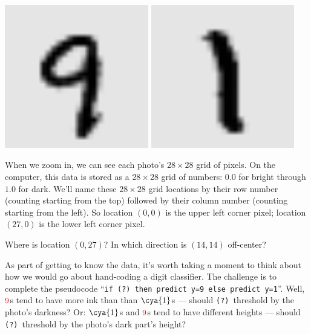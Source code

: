         \begin{marginfigure}
          \vspace{-3.5cm}
          \includegraphics[width=0.47\textwidth]{example-mnist/mnist-trn-00}%
            \hspace{0.03\textwidth}
          \includegraphics[width=0.47\textwidth]{example-mnist/mnist-trn-01}%
        \end{marginfigure}
        When we zoom in, we can see each photo's $28\times 28$ grid of pixels.
        On the computer, this data is stored as a $28\times 28$ grid of
        numbers: $0.0$ for bright through $1.0$ for dark.  We'll name these
        $28\times28$ grid locations by their row number (counting starting from
        the top) followed by their column number (counting starting from the
        left).  So location $(0,0)$ is the upper left corner pixel; location
        $(27,0)$ is the lower left corner pixel.
        \par\noindent
         {Where is location $(0,27)$?  %
        In which direction is $(14,14)$ off-center?}


        As part of getting to know the data, it's worth taking a moment to
        think about how we would go about hand-coding a digit classifier.  The
        challenge is to complete the pseudocode
        ``\texttt{if (?)\ then predict y=9 else predict y=1}''.
        Well, ${\red{9}}$s tend to have more ink than than ${\cya{1}}$s ---
        should \texttt{(?)}\ threshold by the photo's darkness?
        Or: ${\cya{1}}$s and ${\red{9}}$s tend to have different heights ---
        should \texttt{(?)}\ threshold by the photo's dark part's height?

